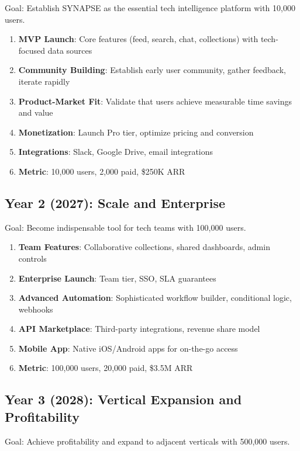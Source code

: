 \documentclass{report}
\begin{document}
Goal: Establish SYNAPSE as the essential tech intelligence platform with 10,000 users.

\begin{enumerate}
    \item \textbf{MVP Launch}: Core features (feed, search, chat, collections) with tech-focused data sources
    \item \textbf{Community Building}: Establish early user community, gather feedback, iterate rapidly
    \item \textbf{Product-Market Fit}: Validate that users achieve measurable time savings and value
    \item \textbf{Monetization}: Launch Pro tier, optimize pricing and conversion
    \item \textbf{Integrations}: Slack, Google Drive, email integrations
    \item \textbf{Metric}: 10,000 users, 2,000 paid, \$250K ARR
\end{enumerate}

\subsection{Year 2 (2027): Scale and Enterprise}

Goal: Become indispensable tool for tech teams with 100,000 users.

\begin{enumerate}
    \item \textbf{Team Features}: Collaborative collections, shared dashboards, admin controls
    \item \textbf{Enterprise Launch}: Team tier, SSO, SLA guarantees
    \item \textbf{Advanced Automation}: Sophisticated workflow builder, conditional logic, webhooks
    \item \textbf{API Marketplace}: Third-party integrations, revenue share model
    \item \textbf{Mobile App}: Native iOS/Android apps for on-the-go access
    \item \textbf{Metric}: 100,000 users, 20,000 paid, \$3.5M ARR
\end{enumerate}

\subsection{Year 3 (2028): Vertical Expansion and Profitability}

Goal: Achieve profitability and expand to adjacent verticals with 500,000 users.
\end{document}
